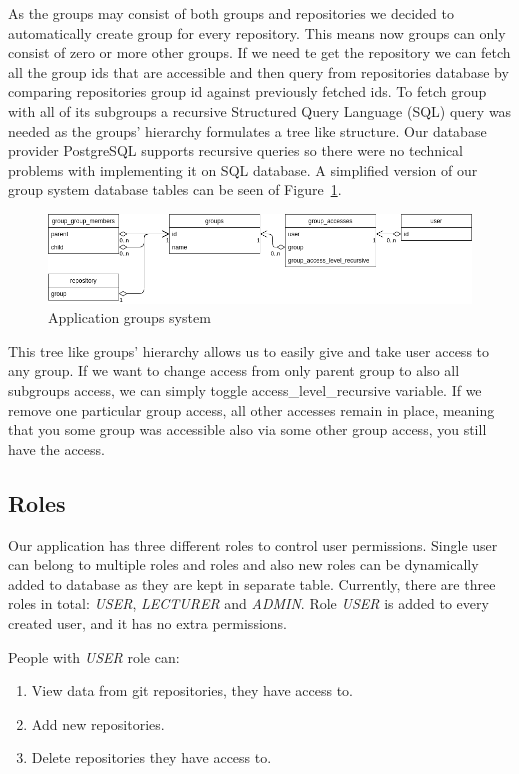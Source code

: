 As the groups may consist of both groups and repositories we decided to automatically create group for every repository.
This means now groups can only consist of zero or more other groups.
If we need te get the repository we can fetch all the group ids that are accessible and then query from repositories database by
comparing repositories group id against previously fetched ids.
To fetch group with all of its subgroups a recursive Structured Query Language (SQL) query was needed as the groups'
hierarchy formulates a tree like structure.
Our database provider PostgreSQL supports recursive queries so there were no technical problems with implementing it on SQL database.
A simplified version of our group system database tables can be seen of Figure~\ref{fig:group-system}.

\begin{figure}[h]
    \includegraphics[width=\textwidth]{figures/group_system}
    \caption{Application groups system}
    \label{fig:group-system}
\end{figure}

This tree like groups' hierarchy allows us to easily give and take user access to any group.
If we want to change access from only parent group to also all subgroups access, we can simply toggle access{\_}level{\_}recursive
variable.
If we remove one particular group access, all other accesses remain in place, meaning that you some group was accessible
also via some other group access, you still have the access.

\subsection{Roles}\label{subsec:roles}
Our application has three different roles to control user permissions.
Single user can belong to multiple roles and roles and also new roles can be dynamically added to database as they are
kept in separate table.
Currently, there are three roles in total: \textit{USER}, \textit{LECTURER} and \textit{ADMIN}.
Role \textit{USER} is added to every created user, and it has no extra permissions.

People with \textit{USER} role can:
\begin{enumerate}
    \item View data from git repositories, they have access to.
    \item Add new repositories.
    \item Delete repositories they have access to.
\end{enumerate}

